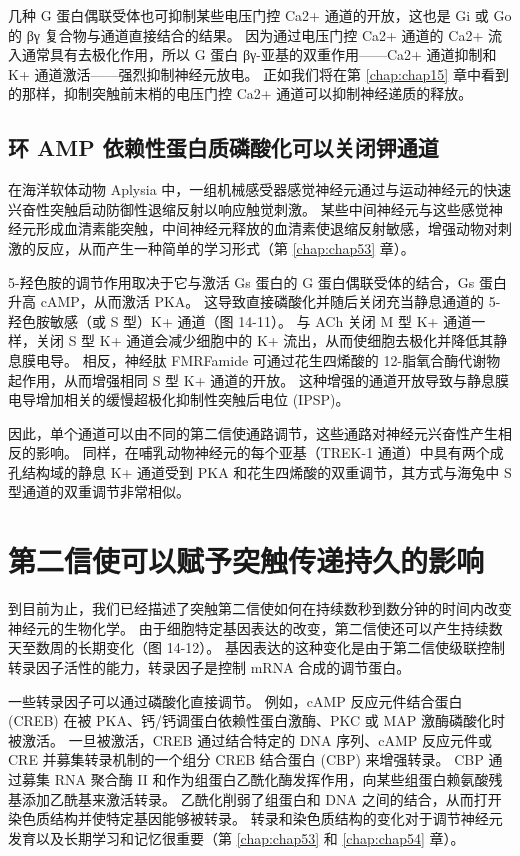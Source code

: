 几种 G 蛋白偶联受体也可抑制某些电压门控 Ca2+ 通道的开放，这也是 Gi 或 Go 的 βγ 复合物与通道直接结合的结果。 
因为通过电压门控 Ca2+ 通道的 Ca2+ 流入通常具有去极化作用，所以 G 蛋白 βγ-亚基的双重作用——Ca2+ 通道抑制和 K+ 通道激活——强烈抑制神经元放电。 
正如我们将在第 \ref{chap:chap15} 章中看到的那样，抑制突触前末梢的电压门控 Ca2+ 通道可以抑制神经递质的释放。


\subsection{环 AMP 依赖性蛋白质磷酸化可以关闭钾通道}

在海洋软体动物 Aplysia 中，一组机械感受器感觉神经元通过与运动神经元的快速兴奋性突触启动防御性退缩反射以响应触觉刺激。 
某些中间神经元与这些感觉神经元形成血清素能突触，中间神经元释放的血清素使退缩反射敏感，增强动物对刺激的反应，从而产生一种简单的学习形式（第 \ref{chap:chap53} 章）。


5-羟色胺的调节作用取决于它与激活 Gs 蛋白的 G 蛋白偶联受体的结合，Gs 蛋白升高 cAMP，从而激活 PKA。 
这导致直接磷酸化并随后关闭充当静息通道的 5-羟色胺敏感（或 S 型）K+ 通道（图 14-11）。 
与 ACh 关闭 M 型 K+ 通道一样，关闭 S 型 K+ 通道会减少细胞中的 K+ 流出，从而使细胞去极化并降低其静息膜电导。 
相反，神经肽 FMRFamide 可通过花生四烯酸的 12-脂氧合酶代谢物起作用，从而增强相同 S 型 K+ 通道的开放。 
这种增强的通道开放导致与静息膜电导增加相关的缓慢超极化抑制性突触后电位 (IPSP)。


因此，单个通道可以由不同的第二信使通路调节，这些通路对神经元兴奋性产生相反的影响。 
同样，在哺乳动物神经元的每个亚基（TREK-1 通道）中具有两个成孔结构域的静息 K+ 通道受到 PKA 和花生四烯酸的双重调节，其方式与海兔中 S 型通道的双重调节非常相似。


\section{第二信使可以赋予突触传递持久的影响}

到目前为止，我们已经描述了突触第二信使如何在持续数秒到数分钟的时间内改变神经元的生物化学。 
由于细胞特定基因表达的改变，第二信使还可以产生持续数天至数周的长期变化（图 14-12）。 
基因表达的这种变化是由于第二信使级联控制转录因子活性的能力，转录因子是控制 mRNA 合成的调节蛋白。


一些转录因子可以通过磷酸化直接调节。 
例如，cAMP 反应元件结合蛋白 (CREB) 在被 PKA、钙/钙调蛋白依赖性蛋白激酶、PKC 或 MAP 激酶磷酸化时被激活。 
一旦被激活，CREB 通过结合特定的 DNA 序列、cAMP 反应元件或 CRE 并募集转录机制的一个组分 CREB 结合蛋白 (CBP) 来增强转录。 
CBP 通过募集 RNA 聚合酶 II 和作为组蛋白乙酰化酶发挥作用，向某些组蛋白赖氨酸残基添加乙酰基来激活转录。 
乙酰化削弱了组蛋白和 DNA 之间的结合，从而打开染色质结构并使特定基因能够被转录。 
转录和染色质结构的变化对于调节神经元发育以及长期学习和记忆很重要（第 \ref{chap:chap53} 和 \ref{chap:chap54} 章）。


